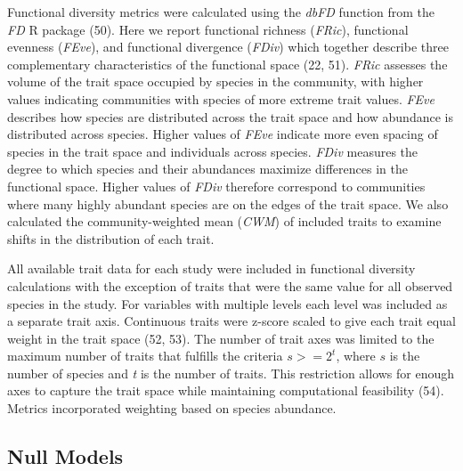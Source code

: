 \documentclass{article}
\begin{document}
Functional diversity metrics were calculated using the \emph{dbFD}
function from the \emph{FD} R package (50). Here we report functional
richness (\emph{FRic}), functional evenness (\emph{FEve}), and
functional divergence (\emph{FDiv}) which together describe three
complementary characteristics of the functional space (22, 51).
\emph{FRic} assesses the volume of the trait space occupied by species
in the community, with higher values indicating communities with species
of more extreme trait values. \emph{FEve} describes how species are
distributed across the trait space and how abundance is distributed
across species. Higher values of \emph{FEve} indicate more even spacing
of species in the trait space and individuals across species.
\emph{FDiv} measures the degree to which species and their abundances
maximize differences in the functional space. Higher values of
\emph{FDiv} therefore correspond to communities where many highly
abundant species are on the edges of the trait space. We also calculated
the community-weighted mean (\emph{CWM}) of included traits to examine
shifts in the distribution of each trait.

All available trait data for each study were included in functional
diversity calculations with the exception of traits that were the same
value for all observed species in the study. For variables with multiple
levels each level was included as a separate trait axis. Continuous
traits were z-score scaled to give each trait equal weight in the trait
space (52, 53). The number of trait axes was limited to the maximum
number of traits that fulfills the criteria \(s >= 2^t\), where \(s\) is
the number of species and \emph{t} is the number of traits. This
restriction allows for enough axes to capture the trait space while
maintaining computational feasibility (54). Metrics incorporated
weighting based on species abundance.

\hypertarget{null-models}{%
\subsection{Null Models}\label{null-models}}
\end{document}

